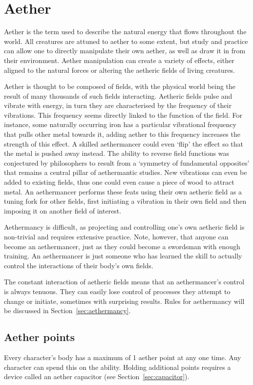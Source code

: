 \documentclass[a4paper,11pt,oneside]{book}
\newcommand{\textlf}[1]{\textbf{\titlecap{#1}}}
\begin{document}
  



\chapter{Aether}
Aether is the term used to describe the natural energy that flows throughout the world. All creatures are attuned to aether to some extent, but study and practice can allow one to directly manipulate their own aether, as well as draw it in from their environment. Aether manipulation can create a variety of effects, either aligned to the natural forces or altering the aetheric fields of living creatures.

Aether is thought to be composed of fields, with the physical world being the result of many thousands of such fields interacting. Aetheric fields pulse and vibrate with energy, in turn they are characterised by the frequency of their vibrations. This frequency seems directly linked to the function of the field. For instance, some naturally occurring iron has a particular vibrational frequency that pulls other metal towards it, adding aether to this frequency increases the strength of this effect. A skilled aethermancer could even `flip' the effect so that the metal is pushed away instead. The ability to reverse field functions was conjectured by philosophers to result from a `symmetry of fundamental opposites' that remains a central pillar of aethermantic studies. New vibrations can even be added to existing fields, thus one could even cause a piece of wood to attract metal. An aethermancer performs these feats using their own aetheric field as a tuning fork for other fields, first initiating a vibration in their own field and then imposing it on another field of interest.

Aethermancy is difficult, as projecting and controlling one's own aetheric field is non-trivial and requires extensive practice. Note, however, that anyone can become an aethermancer, just as they could become a swordsman with enough training. An aethermancer is just someone who has learned the skill to actually control the interactions of their body's own fields. 

The constant interaction of aetheric fields means that an aethermancer's control is always tenuous. They can easily lose control of processes they attempt to change or initiate, sometimes with surprising results. Rules for aethermancy will be discussed in Section~\ref{sec:aethermancy}.

\section{Aether points}
Every character's body has a maximum of 1 aether point at any one time. Any character can spend this on the \textlf{aether surge} ability. Holding additional points requires a device called an aether capacitor (see Section~\ref{sec:capacitor}).
\end{document}
